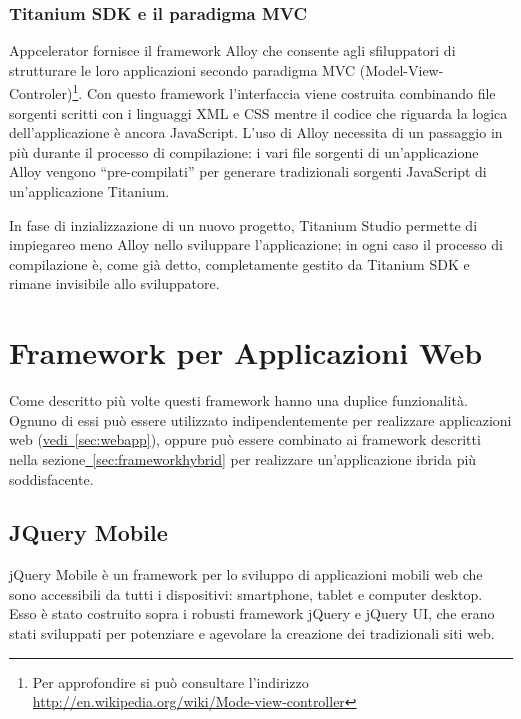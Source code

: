 			\subsubsection{Titanium SDK e il paradigma MVC}
				Appcelerator fornisce il framework Alloy che consente agli 
				sfiluppatori di strutturare le loro applicazioni secondo 
				paradigma MVC (Model-View-Controler)\footnote{Per approfondire 
				si può consultare l'indirizzo\\
				\url{http://en.wikipedia.org/wiki/Mode-view-controller}}. Con 
				questo framework l'interfaccia viene costruita combinando file 
				sorgenti scritti con i linguaggi XML e CSS mentre il codice che 
				riguarda la logica dell'applicazione è ancora JavaScript. 
				L'uso di Alloy necessita di un passaggio in più durante il 
				processo di compilazione: i vari file sorgenti di 
				un'applicazione Alloy vengono ``pre-compilati'' per generare 
				tradizionali sorgenti JavaScript di un'applicazione Titanium.
				
				In fase di inzializzazione di un nuovo progetto, Titanium Studio 
				permette di impiegareo meno Alloy nello sviluppare 
				l'applicazione; in ogni caso il processo di compilazione è, come 
				già detto, completamente gestito da Titanium SDK e rimane 
				invisibile allo	sviluppatore.
			
	\section{Framework per Applicazioni Web}	
	\label{sec:frameworkwebapp}
	
		Come descritto più volte questi framework hanno una duplice funzionalità.
		Ognuno di essi può essere utilizzato indipendentemente per realizzare
		applicazioni web (\hyperref[sec:webapp]{vedi~\ref{sec:webapp}}), oppure 
		può essere combinato ai framework descritti nella 
		sezione\hyperref[sec:frameworkhybrid]{~\ref{sec:frameworkhybrid}} per
		realizzare un'applicazione ibrida più soddisfacente. 
		\subsection{JQuery Mobile}
		\label{subsec:jQuery}
			jQuery Mobile è un framework per lo sviluppo di applicazioni mobili
			web	che sono accessibili da tutti i dispositivi: smartphone, tablet
			e computer desktop. Esso è stato costruito sopra i robusti framework
			jQuery e jQuery UI, che erano stati sviluppati per potenziare e
			agevolare la creazione dei tradizionali siti web. 
			
